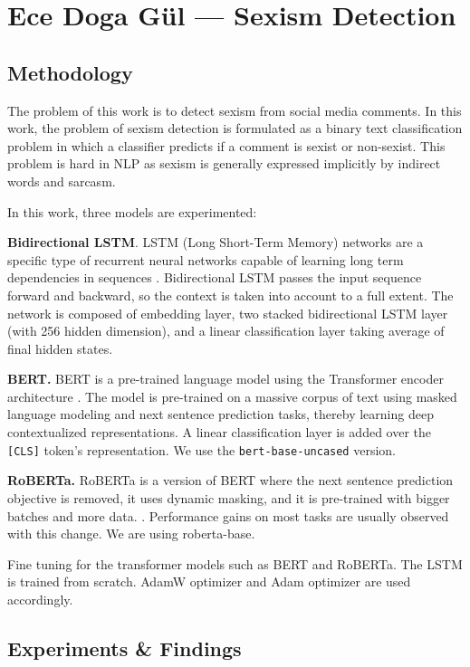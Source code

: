 \documentclass[a4paper,12pt]{report}
\begin{document}
\chapter{Ece Doga G\"{u}l --- Sexism Detection}
\section{Methodology}

The problem of this work is to detect sexism from social media comments. In this work, the problem of sexism detection is formulated as a binary text classification problem in which a classifier predicts if a comment is sexist or non-sexist. This problem is hard in NLP as sexism is generally expressed implicitly by indirect words and sarcasm.

In this work, three models are experimented:

\textbf{Bidirectional LSTM}. LSTM (Long Short-Term Memory) networks are a specific type of recurrent neural networks capable of learning long term dependencies in sequences \cite{hochreiter1997}. Bidirectional LSTM passes the input sequence forward and backward, so the context is taken into account to a full extent. The network is composed of embedding layer, two stacked bidirectional LSTM layer (with 256 hidden dimension), and a linear classification layer taking average of final hidden states.

\textbf{BERT.} BERT is a pre-trained language model using the Transformer encoder architecture \cite{devlin2019}. The model is pre-trained on a massive corpus of text using masked language modeling and next sentence prediction tasks, thereby learning deep contextualized representations. A linear classification layer is added over the \texttt{[CLS]} token's representation. We use the \texttt{bert-base-uncased} version.

\textbf{RoBERTa.} RoBERTa is a version of BERT where the next sentence prediction objective is removed, it uses dynamic masking, and it is pre-trained with bigger batches and more data. \cite{liu2019}. Performance gains on most tasks are usually observed with this change. We are using roberta-base.

Fine tuning for the transformer models such as BERT and RoBERTa. The LSTM is trained from scratch. AdamW optimizer and Adam optimizer are used accordingly.

\newpage

\section{Experiments \& Findings}
\end{document}
